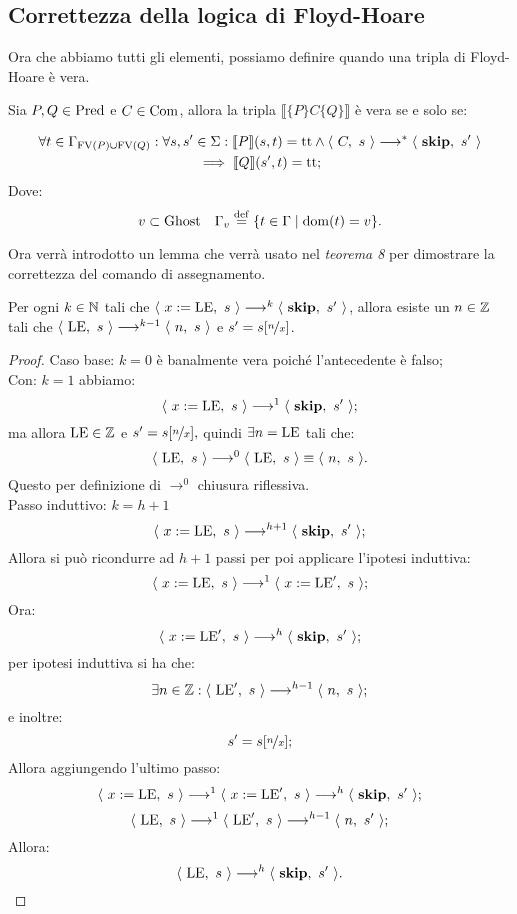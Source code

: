\subsection{Correttezza della logica di Floyd-Hoare}
Ora che abbiamo tutti gli elementi, possiamo definire quando una tripla di Floyd-Hoare è vera.

\begin{definizione} 
Sia $P,Q \in \mathrm{Pred}$ e $C \in \mathrm{Com}$, allora la tripla
$\llbracket \{P\} C\{Q\} \rrbracket$ è vera se e solo se:

\begin{multline*}
       \forall t \in \Gamma_{\mathrm{FV}(P) \cup \mathrm{FV}(Q)} \mathrel{:} 
       \forall  s,s'\in \Sigma \mathrel{:} \llbracket P \rrbracket(s,t) = \mathrm{tt}
       \land \langle\ C,\ s\ \rangle \longrightarrow ^*\langle\ \mathop{\textup{\textbf{skip}}},\ s'\ \rangle\\
       \implies \llbracket Q \rrbracket(s',t)=\mathrm{tt};
\end{multline*}
Dove:
\[
   v \subset \Ghost \quad \Gamma_{v} \defeq \{t \in \Gamma \mid \dom(t) = v \}.
\]
\end{definizione}

Ora verrà introdotto un lemma che verrà usato nel \emph{teorema 8} per 
dimostrare la correttezza del comando di assegnamento.
\begin{lemma} 
Per ogni $k \in \mathbb{N} $ tali che $\langle\ x:=\mathrm{LE},\ s\ \rangle \longrightarrow^k\langle\ \mathop{\textup{\textbf{skip}}},\ s'\ \rangle$, 
allora esiste un $n \in \mathbb{Z}$ tali che $\langle\ \mathrm{LE},\ s\ \rangle \longrightarrow ^{k-1}\langle\ n,\ s\ \rangle$
e $s'=s [\nicefrac{n}{x}]$.

\begin{proof}
Caso base: $k = 0$ è banalmente vera poiché l'antecedente è falso;\\
Con: $k = 1$ abbiamo:
\[
   \langle\ x:=\mathrm{LE},\ s\ \rangle \longrightarrow ^{1}\langle\ \mathop{\textup{\textbf{skip}}},\ s'\ \rangle;
\]
ma allora $\mathrm{LE} \in \mathbb{Z}$ e $s'=s[\nicefrac{n}{x}],$ quindi $\exists n=\mathrm{LE}$ tali che:
\[
   \langle\ \mathrm{LE},\ s\ \rangle \longrightarrow ^{0}\langle\ \mathrm{LE},\ s\ \rangle \equiv \langle\ n,\ s\ \rangle.
\]
Questo per definizione di $\rightarrow ^0$ chiusura riflessiva.\\
Passo induttivo: $k = h+1$
\[
   \langle\ x:=\mathrm{LE},\ s\ \rangle \longrightarrow ^{h+1}\langle\ \mathop{\textup{\textbf{skip}}},\ s'\ \rangle;
\]
Allora si può ricondurre ad $h+1$ passi per poi applicare l'ipotesi induttiva:
\[
   \langle\ x:=\mathrm{LE},\ s\ \rangle \longrightarrow ^{1}\langle\ x:=\mathrm{LE}',\ s\ \rangle;
\]
Ora:
\[
   \langle\ x:=\mathrm{LE}',\ s\ \rangle \longrightarrow ^{h}\langle\ \mathop{\textup{\textbf{skip}}},\ s'\ \rangle;
\]
per ipotesi induttiva si ha che:
\[
   \exists n \in\mathbb{Z}\mathrel{:} \langle\ \mathrm{LE}',\ s\ \rangle \longrightarrow ^{h-1}\langle\ n,\ s\ \rangle;
\]
e inoltre:
\[
   s'=s [\nicefrac{n}{x}];
\]
Allora aggiungendo l'ultimo passo:
\[
   \langle\ x:=\mathrm{LE},\ s\ \rangle \longrightarrow ^{1}\langle\ x:=\mathrm{LE}',\ s\ \rangle \longrightarrow ^{h} \langle\ \mathop{\textup{\textbf{skip}}},\ s'\ \rangle;
\]
\[
   \langle\ \mathrm{LE},\ s\ \rangle \longrightarrow ^{1}\langle\ \mathrm{LE}',\ s\ \rangle \longrightarrow ^{h-1} \langle\ n,\ s'\ \rangle;
\]
Allora:
\[
   \langle\ \mathrm{LE},\ s\ \rangle \longrightarrow ^{h} \langle\ \mathop{\textup{\textbf{skip}}},\ s'\ \rangle.
\]
\end{proof}
\end{lemma}

